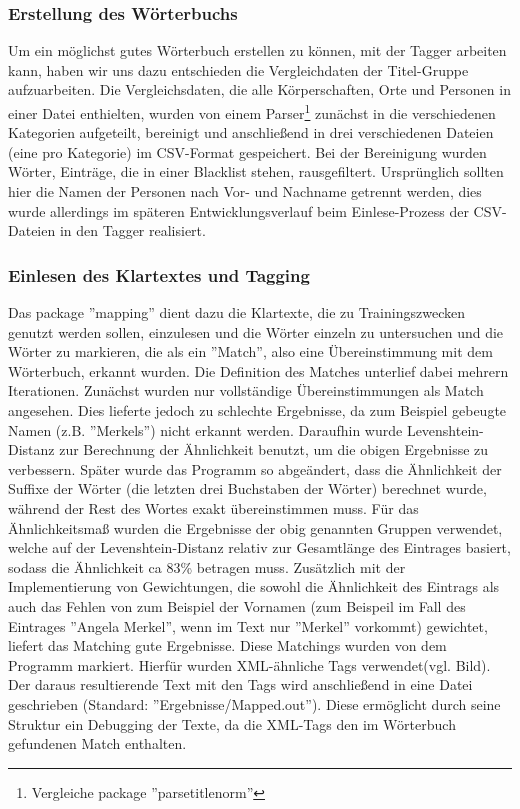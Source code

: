 \documentclass[a4paper]{article}
\begin{document}
\subsubsection{Erstellung des Wörterbuchs}
Um ein möglichst gutes Wörterbuch erstellen zu können, mit der Tagger arbeiten kann, haben wir uns dazu entschieden die Vergleichdaten der Titel-Gruppe aufzuarbeiten.
Die Vergleichsdaten, die alle Körperschaften, Orte und Personen in einer Datei enthielten, wurden von einem Parser\footnote{Vergleiche package ''parsetitlenorm''} zunächst in die verschiedenen Kategorien aufgeteilt, bereinigt und anschließend in drei verschiedenen Dateien (eine pro Kategorie) im CSV-Format gespeichert. Bei der Bereinigung wurden Wörter, Einträge, die in einer Blacklist stehen, rausgefiltert. Ursprünglich sollten hier die Namen der Personen nach Vor- und Nachname getrennt werden, dies wurde allerdings im späteren Entwicklungsverlauf beim Einlese-Prozess der CSV-Dateien in den Tagger realisiert.

\subsubsection{Einlesen des Klartextes und Tagging}
Das package ''mapping'' dient dazu die Klartexte, die zu Trainingszwecken genutzt werden sollen, einzulesen und die Wörter einzeln zu untersuchen und die Wörter zu markieren, die als ein ''Match'', also eine Übereinstimmung mit dem Wörterbuch, erkannt wurden.
Die Definition des Matches unterlief dabei mehrern Iterationen. Zunächst wurden nur vollständige Übereinstimmungen als Match angesehen.
Dies lieferte jedoch zu schlechte Ergebnisse, da zum Beispiel gebeugte Namen (z.B. ''Merkels'') nicht erkannt werden.
Daraufhin wurde Levenshtein-Distanz zur Berechnung der Ähnlichkeit benutzt, um die obigen Ergebnisse zu verbessern. Später wurde das Programm so abgeändert, dass die Ähnlichkeit der Suffixe der Wörter (die letzten drei Buchstaben der Wörter) berechnet wurde, während der Rest des Wortes exakt übereinstimmen muss. Für das Ähnlichkeitsmaß wurden die Ergebnisse der obig genannten Gruppen verwendet, welche auf der Levenshtein-Distanz relativ zur Gesamtlänge des Eintrages basiert, sodass die Ähnlichkeit ca 83\% betragen muss.
Zusätzlich mit der Implementierung von Gewichtungen, die sowohl die Ähnlichkeit des Eintrags als auch das Fehlen von zum Beispiel der Vornamen (zum Beispeil im Fall des Eintrages ''Angela Merkel'', wenn im Text nur ''Merkel'' vorkommt) gewichtet, liefert das Matching gute Ergebnisse. Diese Matchings wurden von dem Programm markiert. Hierfür wurden XML-ähnliche Tags verwendet(vgl. Bild).
Der daraus resultierende Text mit den Tags wird anschließend in eine Datei geschrieben (Standard: ''Ergebnisse/Mapped.out''). Diese ermöglicht durch seine Struktur ein Debugging der Texte, da die XML-Tags den im Wörterbuch gefundenen Match enthalten.
\end{document}
